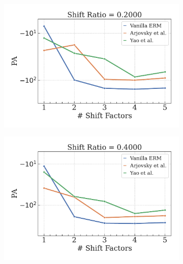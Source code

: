 \begin{figure}[H]
    \centering
    \begin{subfigure}[b]{0.3\textwidth}
        \centering
        \includegraphics[width=\textwidth]{img/results_discussion/datashift/shift_ratio=0.200.pdf}
    \end{subfigure}
    \hfill
    \begin{subfigure}[b]{0.3\textwidth}
        \centering
        \includegraphics[width=\textwidth]{img/results_discussion/datashift/shift_ratio=0.400.pdf}
    \end{subfigure}
    \hfill
    \begin{subfigure}[b]{0.3\textwidth}
        \centering

\end{subfigure}
\end{figure}
